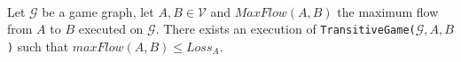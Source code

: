 \begin{lemma} \ \\
   \label{maxflowgame}
   Let $\mathcal{G}$ be a game graph, let $A, B \in \mathcal{V}$ and $MaxFlow\left(A, B\right)$ the maximum flow from
   $A$ to $B$ executed on $\mathcal{G}$. There exists an execution of
   \texttt{TransitiveGame(}$\mathcal{G}, A, B$\texttt{)} such that $maxFlow\left(A, B\right) \leq Loss_A$.
\end{lemma}
